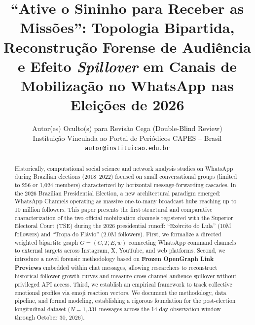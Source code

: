 \documentclass[12pt]{article}
\title{``Ative o Sininho para Receber as Missões'': Topologia Bipartida, Reconstrução Forense de Audiência e Efeito \textit{Spillover} em Canais de Mobilização no WhatsApp nas Eleições de 2026}
\author{Autor(es) Oculto(s) para Revisão Cega (Double-Blind Review)\\
Instituição Vinculada ao Portal de Periódicos CAPES -- Brasil\\
\texttt{autor@instituicao.edu.br}
}
\date{}
\begin{document}
\maketitle

\begin{abstract}
Historically, computational social science and network analysis studies on WhatsApp during Brazilian elections (2018--2022) focused on small conversational groups (limited to 256 or 1,024 members) characterized by horizontal message-forwarding cascades. In the 2026 Brazilian Presidential Election, a new architectural paradigm emerged: WhatsApp Channels operating as massive one-to-many broadcast hubs reaching up to 10 million followers. This paper presents the first structural and comparative characterization of the two official mobilization channels registered with the Superior Electoral Court (TSE) during the 2026 presidential runoff: ``Exército do Lula'' (10M followers) and ``Tropa do Flávio'' (2.0M followers). First, we formalize a directed weighted bipartite graph $G = (C, T, E, w)$ connecting WhatsApp command channels to external targets across Instagram, X, YouTube, and web platforms. Second, we introduce a novel forensic methodology based on \textbf{Frozen OpenGraph Link Previews} embedded within chat messages, allowing researchers to reconstruct historical follower growth curves and measure cross-channel audience spillover without privileged API access. Third, we establish an empirical framework to track collective emotional profiles via emoji reaction vectors. We document the methodology, data pipeline, and formal modeling, establishing a rigorous foundation for the post-election longitudinal dataset ($N=1,331$ messages across the 14-day observation window through October 30, 2026).
\end{abstract}
\end{document}

